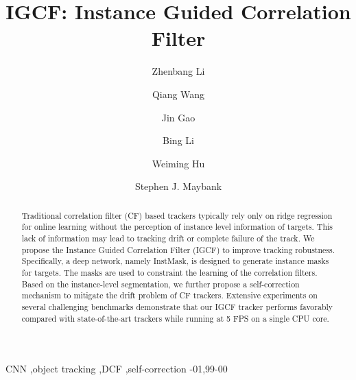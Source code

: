 \documentclass[review]{elsarticle}
\begin{document}
\begin{frontmatter}

\title{IGCF: Instance Guided Correlation Filter}

\author[address1,address3]{Zhenbang Li}
\author[address1,address3]{Qiang Wang}
\author[address1]{Jin Gao}
\author[address1]{Bing Li}
\author[address1,address2,address3]{Weiming Hu}
\author[address4]{Stephen J. Maybank}
\address[address1]{National Laboratory of Pattern Recognition, Institute of Automation, Chinese Academy of Sciences, Beijing 100190, PR China}
\address[address2]{CAS Center for Excellence in Brain Science and Intelligence Technology, Chinese Academy of Sciences, Beijing 100190, PR China}
\address[address3]{University of Chinese Academy of Sciences, Beijing 100190, PR China}
\address[address4]{Department of Computer Science and Information Systems, Birkbeck College, London WC1E 7HX, United Kingdom}

\begin{abstract}
Traditional correlation filter (CF) based trackers typically rely only on ridge regression for online learning without the perception of instance level information of targets. This lack of information may lead to tracking drift or complete failure of the track. We propose the Instance Guided Correlation Filter (IGCF) to improve tracking robustness. Specifically, a deep network, namely InstMask, is designed to generate instance masks for targets. The masks are used to constraint the learning of the correlation filters. Based on the instance-level segmentation, we further propose a self-correction mechanism to mitigate the drift problem of CF trackers. Extensive experiments on several challenging benchmarks demonstrate that our IGCF tracker performs favorably compared with state-of-the-art trackers while running at 5 FPS on a single CPU core.
\end{abstract}

\begin{keyword}
CNN \sep object tracking \sep DCF \sep self-correction
-01\sep  99-00
\end{keyword}

\end{frontmatter}

\linenumbers
\end{document}
